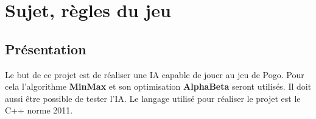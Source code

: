 \documentclass[article, backcover, french, nodocumentinfo]{upmethodology-document}
\begin{document}
	\upmdocumentsummary{}
	\upmdocumentauthors{}
	\upmdocumentinformedpeople{}
	\upmpublicationpage{}
	\thispagestyle{empty}
	\tableofcontents{}
	\lstlistoflistings{}
	\listoffigures{}
	\newpage{}

	\section{Sujet, règles du jeu}
		\subsection{Présentation}
			Le but de ce projet est de réaliser une IA capable de jouer au jeu de Pogo. Pour cela l'algorithme \textbf{MinMax} et son optimisation \textbf{AlphaBeta} seront utilisés. Il doit aussi être possible de tester l'IA. Le langage utilisé pour réaliser le projet est le C++ norme 2011.
\end{document}
